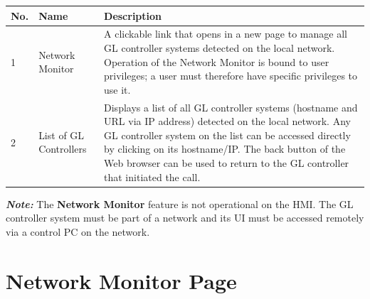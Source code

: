 \begin{longtable}[]{@{}|l|l|l|@{}}
\toprule
\rowcolor{brown}\begin{minipage}[b]{0.04\columnwidth}\raggedright
{\bf{No.}}\strut
\end{minipage} & \begin{minipage}[b]{0.23\columnwidth}\raggedright
{\bf{Name}}\strut
\end{minipage} & \begin{minipage}[b]{0.65\columnwidth}\raggedright
{\bf{Description}}\strut
\end{minipage}\tabularnewline
\midrule
\endhead
\begin{minipage}[t]{0.04\columnwidth}\raggedright
1\strut
\end{minipage} & \begin{minipage}[t]{0.23\columnwidth}\raggedright
Network Monitor\strut
\end{minipage} & \begin{minipage}[t]{0.65\columnwidth}\raggedright
A clickable link that opens in a new page to manage all GL controller
systems detected on the local network. Operation of the Network Monitor
is bound to user privileges; a user must therefore have specific
privileges to use it.\strut
\end{minipage}\tabularnewline
\begin{minipage}[t]{0.04\columnwidth}\raggedright
2\strut
\end{minipage} & \begin{minipage}[t]{0.23\columnwidth}\raggedright
List of GL Controllers\strut
\end{minipage} & \begin{minipage}[t]{0.65\columnwidth}\raggedright
Displays a list of all GL controller systems (hostname and URL via IP
address) detected on the local network. Any GL controller system on the
list can be accessed directly by clicking on its hostname/IP. The back
button of the Web browser can be used to return to the GL controller
that initiated the call.\strut
\end{minipage}\tabularnewline
\bottomrule
\end{longtable}

\textbf{\emph{Note:}} The \textbf{Network Monitor} feature is not
operational on the HMI. The GL controller system must be part of a
network and its UI must be accessed remotely via a control PC on the
network.


\section{Network Monitor Page}

